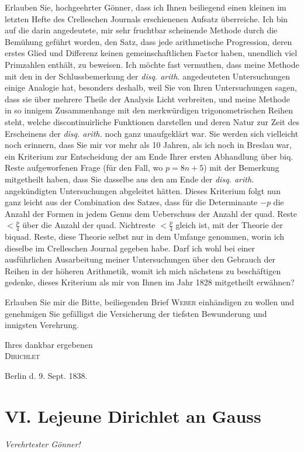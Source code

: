 \documentclass[11pt]{article}
\newcommand{\scn}[1]{\textsc{#1}}
\begin{document}
Erlauben Sie, hochgeehrter Gönner, dass ich Ihnen beiliegend einen kleinen im letzten Hefte des Crelleschen Journals erschienenen Aufsatz überreiche. Ich bin auf die darin angedeutete, mir sehr fruchtbar scheinende Methode durch die Bemühung geführt worden, den Satz, dass jede arithmetische Progression, deren erstes Glied und Differenz keinen gemeinschaftlichen Factor haben, unendlich viel Primzahlen enthält, zu beweisen. Ich möchte fast vermuthen, dass meine Methode mit den in der Schlussbemerkung der \emph{disq. arith.} angedeuteten Untersuchungen einige Analogie hat, besonders deshalb, weil Sie von Ihren Untersuchungen sagen, dass sie über mehrere Theile der Analysis Licht verbreiten, und meine Methode in so innigem Zusammenhange mit den merkwürdigen trigonometrischen Reihen steht, welche discontinuirliche Funktionen darstellen und deren Natur zur Zeit des Erscheinens der \emph{disq. arith.} noch ganz unaufgeklärt war. Sie werden sich vielleicht noch erinnern, dass Sie mir vor mehr als 10 Jahren, als ich noch in Breslau war, ein Kriterium zur Entscheidung der am Ende Ihrer ersten Abhandlung über biq. Reste aufgeworfenen Frage (für den Fall, wo $p=8n+5$) mit der Bemerkung mitgetheilt haben, dass Sie dasselbe aus den am Ende der \emph{disq. arith.} angekündigten Untersuchungen abgeleitet hätten. Dieses Kriterium folgt nun ganz leicht aus der Combination des Satzes, dass für die Determinante $-p$ die Anzahl der Formen in jedem Genus dem Ueberschuss der Anzahl der quad. Reste $<\frac p4$ über die Anzahl der quad. Nichtreste $<\frac p4$ gleich ist, mit der Theorie der biquad. Reste, diese Theorie selbst nur in dem Umfange genommen, worin ich dieselbe im Crelleschen Journal gegeben habe. Darf ich wohl bei einer ausführlichen Ausarbeitung meiner Untersuchungen über den Gebrauch der Reihen in der höheren Arithmetik, womit ich mich nächstens zu beschäftigen gedenke, dieses Kriterium als mir von Ihnen im Jahr 1828 mitgetheilt erwähnen?

Erlauben Sie mir die Bitte, beiliegenden Brief \scn{Weber} einhändigen zu wollen und genehmigen Sie gefälligst die Versicherung der tiefsten Bewunderung und innigsten Verehrung.

\begin{flushright}
Ihres dankbar ergebenen\\
\scn{Dirichlet}
\end{flushright}
Berlin d. 9. Sept. 1838.

\section*{VI. Lejeune Dirichlet an Gauss}
\begin{center}\emph{Verehrtester Gönner!}\end{center}
\end{document}
